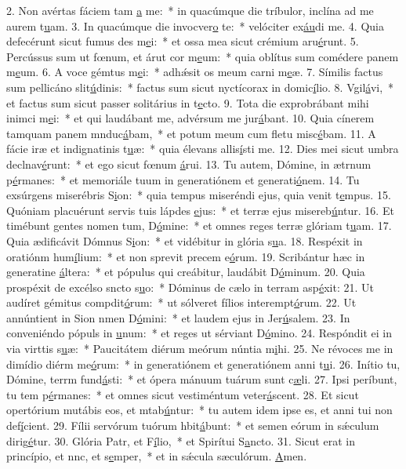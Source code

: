 2. Non avértas fáciem tam \uline{a} me:~* in quacúmque die tríbulor, inclína ad me aurem t\uline{u}am.
3. In quacúmque die invocver\uline{o} te:~* velóciter ex\uline{áu}di me.
4. Quia defecérunt sicut fumus des m\uline{e}i:~* et ossa mea sicut crémium aru\uline{é}runt.
5. Percússus sum ut fœnum, et árut cor m\uline{e}um:~* quia oblítus sum comédere panem m\uline{e}um.
6. A voce gémtus m\uline{e}i:~* adhǽsit os meum carni m\uline{e}æ.
7. Símilis factus sum pellicáno slit\uline{ú}dinis:~* factus sum sicut nyctícorax in domic\uline{í}lio.
8. Vgil\uline{á}vi,~* et factus sum sicut passer solitárius in t\uline{e}cto.
9. Tota die exprobrábant mihi inimci m\uline{e}i:~* et qui laudábant me, advérsum me jur\uline{á}bant.
10. Quia cínerem tamquam panem mnduc\uline{á}bam,~* et potum meum cum fletu misc\uline{é}bam.
11. A fácie iræ et indignatinis t\uline{u}æ:~* quia élevans allis\uline{í}sti me.
12. Dies mei sicut umbra declnav\uline{é}runt:~* et ego sicut fœnum \uline{á}rui.
13. Tu autem, Dómine, in ætrnum p\uline{é}rmanes:~* et memoriále tuum in generatiónem et generati\uline{ó}nem.
14. Tu exsúrgens miserébris S\uline{i}on:~* quia tempus miseréndi ejus, quia venit t\uline{e}mpus.
15. Quóniam placuérunt servis tuis lápdes \uline{e}jus:~* et terræ ejus misereb\uline{ú}ntur.
16. Et timébunt gentes nomen tum, D\uline{ó}mine:~* et omnes reges terræ glóriam t\uline{u}am.
17. Quia ædificávit Dómnus S\uline{i}on:~* et vidébitur in glória s\uline{u}a.
18. Respéxit in oratiónm hum\uline{í}lium:~* et non sprevit precem e\uline{ó}rum.
19. Scribántur hæc in generatine \uline{á}ltera:~* et pópulus qui creábitur, laudábit D\uline{ó}minum.
20. Quia prospéxit de excélso sncto s\uline{u}o:~* Dóminus de cælo in terram asp\uline{é}xit:
21. Ut audíret gémitus compdit\uline{ó}rum:~* ut sólveret fílios interempt\uline{ó}rum.
22. Ut annúntient in Sion nmen D\uline{ó}mini:~* et laudem ejus in Jer\uline{ú}salem.
23. In conveniéndo pópuls in \uline{u}num:~* et reges ut sérviant D\uline{ó}mino.
24. Respóndit ei in via virttis s\uline{u}æ:~* Paucitátem diérum meórum núntia m\uline{i}hi.
25. Ne révoces me in dimídio diérm me\uline{ó}rum:~* in generatiónem et generatiónem anni t\uline{u}i.
26. Inítio tu, Dómine, terrm fund\uline{á}sti:~* et ópera mánuum tuárum sunt c\uline{æ}li.
27. Ipsi períbunt, tu tem p\uline{é}rmanes:~* et omnes sicut vestiméntum veter\uline{á}scent.
28. Et sicut opertórium mutábis eos, et mtab\uline{ú}ntur:~* tu autem idem ipse es, et anni tui non def\uline{í}cient.
29. Fílii servórum tuórum hbit\uline{á}bunt:~* et semen eórum in sǽculum dirig\uline{é}tur.
30. Glória Patr, et F\uline{í}lio,~* et Spirítui S\uline{a}ncto.
31. Sicut erat in princípio, et nnc, et s\uline{e}mper,~* et in sǽcula sæculórum. \uline{A}men.
